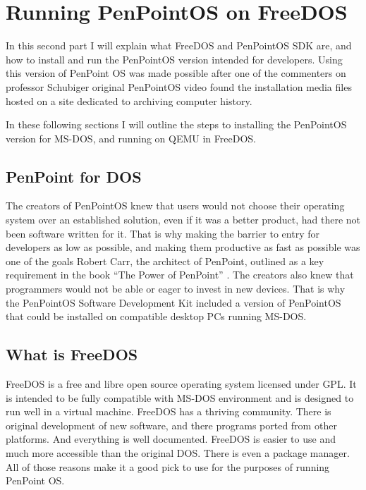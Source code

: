 \clearpage %

\section{Running PenPointOS on FreeDOS}

In this second part I will explain what FreeDOS and PenPointOS SDK are, and how
to install and run the PenPointOS version intended for developers. Using this
version of PenPoint OS was made possible after one of the commenters on
professor Schubiger original PenPointOS video found the installation media
files hosted on a site dedicated to archiving computer history.

In these following sections I will outline the steps to installing the
PenPointOS version for MS-DOS, and running on QEMU in FreeDOS.

\subsection{PenPoint for DOS}

The creators of PenPointOS knew that users would not choose their operating
system over an established solution, even if it was a better product, had there
not been software written for it. That is why making the barrier to entry for
developers as low as possible, and making them productive as fast as possible
was one of the goals Robert Carr, the architect of PenPoint, outlined as a key
requirement in the book ``The Power of PenPoint'' \cite{carr1991}. The creators
also knew that programmers would not be able or eager to invest in new devices.
That is why the PenPointOS Software Development Kit included a version of
PenPointOS that could be installed on compatible desktop PCs running MS-DOS.

\subsection{What is FreeDOS}

FreeDOS is a free and libre open source operating system licensed under GPL. It
is intended to be fully compatible with MS-DOS environment and is designed to
run well in a virtual machine. FreeDOS has a thriving community. There is
original development of new software, and there programs ported from other
platforms. And everything is well documented.  FreeDOS is easier to use and
much more accessible than the original DOS.  There is even a package manager.
All of those reasons make it a good pick to use for the purposes of running
PenPoint OS.

